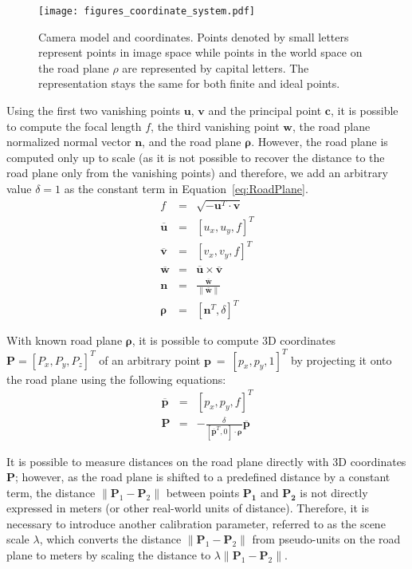 \documentclass[]{elsarticle}
\begin{document}
\begin{figure}[t]
	\centering
	\texttt{[image: figures\_coordinate\_system.pdf]}
	\caption{Camera model and coordinates. Points denoted by small letters represent points in image space while points in the world space on the road plane  $\rho$ are represented by capital letters. The representation stays the same for both finite and ideal points.}
	\label{fig:coords}
\end{figure}

Using the first two vanishing points $\mathbf{u}$, $\mathbf{v}$ and the principal point $\mathbf{c}$, it is possible to compute the focal length $f$, the third vanishing point $\mathbf{w}$, the road plane normalized normal vector $\mathbf{n}$, and the road plane $\boldsymbol{\rho}$. However, the road plane is computed only up to scale (as it is not possible to recover the distance to the road plane only from the vanishing points) and therefore, we add an arbitrary value $\delta = 1$ as the constant term in Equation~\eqref{eq:RoadPlane}.
\begin{eqnarray}
	\label{eq:focal}
	f &=& \sqrt{-\mathbf{u}^T \cdot \mathbf{v}}\\
	\mathbf{\overline{u}} &=& [u_x, u_y, f]^T\\
	\mathbf{\overline{v}} &=& [v_x, v_y, f]^T\\
	\mathbf{\overline{w}} &=& \mathbf{\overline{u}} \times \mathbf{\overline{v}} \\
	\mathbf{n} &=& \frac{\mathbf{\overline{w}}}{\|\mathbf{\overline{w}}\|}\\
	\boldsymbol{\rho} &=& \left[\mathbf{n}^T,\delta\right]^T \label{eq:RoadPlane}
\end{eqnarray}


With known road plane $\boldsymbol{\rho}$, it is possible to compute 3D coordinates $\mathbf{P} = [P_x, P_y, P_z]^T$  of an arbitrary point $\mathbf{p}~=~[p_x,p_y,1]^T$ by projecting it onto the road plane using the following equations:
\begin{eqnarray}
\mathbf{\overline{p}} &=& [p_x, p_y, f]^T\\
\mathbf{P} &=&  - \frac{\delta}{\left[\mathbf{\overline{p}}^T, 0\right] \cdot \boldsymbol{\rho}} \mathbf{\overline{p}}  \label{eq:3DCoords}
\end{eqnarray}

It is possible to measure distances on the road plane directly with 3D coordinates $\mathbf{P}$; however, as the road plane is shifted to a predefined distance by a constant term, the distance $\| \mathbf{P}_1 - \mathbf{P}_2 \|$ between points $\mathbf{P_1}$ and $\mathbf{P_2}$ is not directly expressed in meters (or other real-world units of distance). Therefore, it is necessary to introduce another calibration parameter, referred to as the scene scale $\lambda$, which converts the distance $\| \mathbf{P}_1 - \mathbf{P}_2 \|$ from pseudo-units on the road plane to meters by scaling the distance to $\lambda \| \mathbf{P}_1 - \mathbf{P}_2 \|$.
\end{document}
